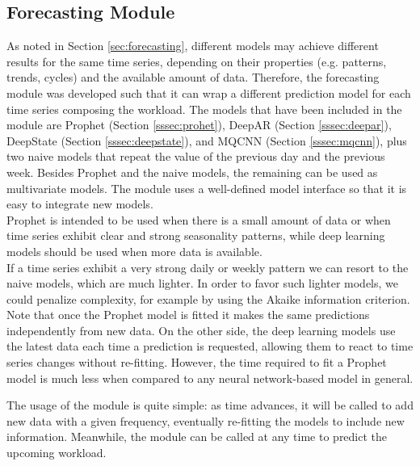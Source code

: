 \documentclass[a4paper, 12pt]{article} %
\begin{document}
	\subsection{Forecasting Module} \label{ssec:forecasting_module}
	As noted in Section \ref{sec:forecasting}, different models may achieve different results for the same time series, depending on their properties (e.g. patterns, trends, cycles) and the available amount of data. Therefore, the forecasting module was developed such that it can wrap a different prediction model for each time series composing the workload.
	The models that have been included in the module are Prophet (Section \ref{sssec:prohet}), DeepAR (Section \ref{sssec:deepar}), DeepState (Section \ref{sssec:deepstate}), and MQCNN (Section \ref{sssec:mqcnn}), plus two naive models that repeat the value of the previous day and the previous week. Besides Prophet and the naive models, the remaining can be used as multivariate models. The module uses a well-defined model interface so that it is easy to integrate new models.\\
	Prophet is intended to be used when there is a small amount of data or when time series exhibit clear and strong seasonality patterns, while deep learning models should be used when more data is available.\\
	If a time series exhibit a very strong daily or weekly pattern we can resort to the naive models, which are much lighter. In order to favor such lighter models, we could penalize complexity, for example by using the Akaike information criterion. \\
	Note that once the Prophet model is fitted it makes the same predictions independently from new data. On the other side, the deep learning models use the latest data each time a prediction is requested, allowing them to react to time series changes without re-fitting. However, the time required to fit a Prophet model is much less when compared to any neural network-based model in general.
	
	The usage of the module is quite simple: as time advances, it will be called to add new data with a given frequency, eventually re-fitting the models to include new information. Meanwhile, the module can be called at any time to predict the upcoming workload. 
	
\end{document}
